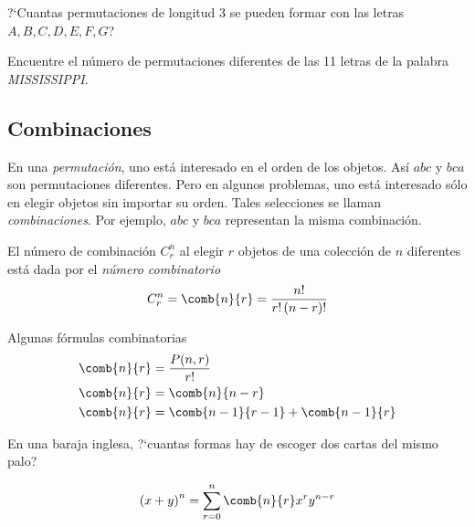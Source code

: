 {}
\begin{ejemplo}
 \label{exmp:1.16}
 ?`Cuantas permutaciones de longitud 3 se pueden formar con las letras $A,B,C,D,E,F,G$?
\end{ejemplo}


{}
\begin{ejemplo}
 \label{exmp:1.17}
 Encuentre el número de permutaciones diferentes de las 11 letras de la palabra \emph{MISSISSIPPI}.
\end{ejemplo}


\subsection{Combinaciones}
{}
En una \emph{permutación}, uno está interesado en el orden de los objetos. Así $abc$ y $bca$ son permutaciones diferentes.  Pero en algunos problemas, uno está interesado sólo en elegir objetos sin importar su orden.  Tales selecciones se llaman \emph{combinaciones}.  Por ejemplo, $abc$ y $bca$ representan la misma combinación.



 El número de combinación $ C^{n}_{r} $ al elegir $r$ objetos de una colección de $n$ diferentes está dada por el \emph{número combinatorio}
  \begin{align}
   \label{1.29}
  C^{n}_{r} = \comb{n}{r}=\dfrac{n!}{r!\left( n-r \right)!}
  \end{align}



{Algunas fórmulas combinatorias}
\begin{align}
 \label{1.30}
 \comb{n}{r}&=\dfrac{P(n,r)}{r!} \\
 \label{1.31}
 \comb{n}{r}&=\comb{n}{n-r}\\
 \comb{n}{r}&=\comb{n-1}{r-1}+\comb{n-1}{r}
\end{align}


{}
\begin{ejemplo}
 \label{exmp:1.18}
 En una baraja inglesa, ?`cuantas formas hay de escoger dos cartas del mismo palo?
\end{ejemplo}


{}
\begin{thm}
 \begin{align}
  \label{1.32}
  \left( x+y \right)^{n} = \sum_{r=0}^{n}\comb{n}{r}x^{r}y^{n-r}
 \end{align}

\end{thm}


